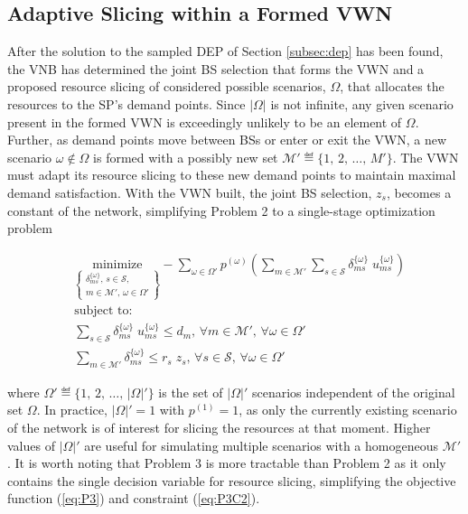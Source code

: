 \documentclass[onecolumn,draftcls]{IEEEtran}
\begin{document}
\subsection{Adaptive Slicing within a Formed VWN} \label{subsec:slice}

After the solution to the sampled DEP of Section \ref{subsec:dep} has been found, the VNB has determined the joint BS selection that forms the VWN and a proposed resource slicing of considered possible scenarios, $\Omega$, that allocates the resources to the SP's demand points.  Since $|\Omega|$ is not infinite, any given scenario present in the formed VWN is exceedingly unlikely to be an element of $\Omega$.  Further, as demand points move between BSs or enter or exit the VWN, a new scenario $\omega \notin \Omega$ is formed with a possibly new set $\mathcal{M}' \eqdef \{1,\, 2,\, \ldots,\, M'\}$.  The VWN must adapt its resource slicing to these new demand points to maintain maximal demand satisfaction.  With the VWN built, the joint BS selection, $z_s$, becomes a constant of the network, simplifying Problem 2 to a single-stage optimization problem

\vspace{5mm}
\begin{tcolorbox}[title = Problem 3 (Deterministic Adaptive Slicing)]
\begin{align}
& 
\underset{\left\{ \substack{
	\delta_{ms}^{\{\omega\}},\,	s \in \mathcal{S},\\
	m \in \mathcal{M}',\, \omega \in \Omega'} \right\}} {\text{minimize}}
- \sum_{\omega \in \Omega'} p^{(\omega)} \left( \sum_{m \in \mathcal{M}'} \sum_{s \in \mathcal{S}} \delta_{ms}^{\{\omega\}} \; u_{ms}^{\{\omega\}} \right) \label{eq:P3}\\
& \text{subject to:}  \nonumber \\
& \sum_{s \in \mathcal{S}} \delta_{ms}^{\{\omega\}} \; u_{ms}^{\{\omega\}} \leq d_m,\, \forall m \in \mathcal{M}',\, \forall \omega \in \Omega' \label{eq:P3C1}\\
& \sum_{m \in \mathcal{M}'} \delta_{ms}^{\{\omega\}} \leq r_s \; z_s,\, \forall s \in \mathcal{S},\, \forall \omega \in \Omega' \label{eq:P3C2}
\end{align}
\end{tcolorbox}

\noindent where $\Omega' \eqdef \{1,\, 2,\, \ldots,\, |\Omega|'\}$ is the set of $|\Omega|'$ scenarios independent of the original set $\Omega$.  In practice, $|\Omega|' = 1$ with $p^{(1)} = 1$, as only the currently existing scenario of the network is of interest for slicing the resources at that moment.  Higher values of $|\Omega|'$ are useful for simulating multiple scenarios with a homogeneous $\mathcal{M}'$.  It is worth noting that Problem 3 is more tractable than Problem 2 as it only contains the single decision variable for resource slicing, simplifying the objective function (\ref{eq:P3}) and constraint (\ref{eq:P3C2}).
\end{document}
